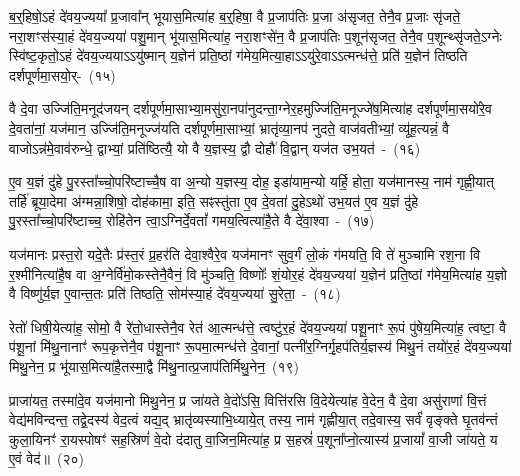 {\anuvakamend[{अ॒न्वा॒हा॒र्ये॑ण प्र॒जा\-प॑तेरसि॒ ह्य॑मुष्मिँ॑ल्लो॒के पञ्च॑दश च}]}

ब॒र्॒\mbox{}हिषो॒\-ऽहं दे॑वय॒ज्यया᳚ प्र॒जावा᳚न् भूयास॒मित्या॑ह ब॒र्॒\mbox{}हिषा॒ वै प्र॒जा\-प॑तिः प्र॒जा अ॑सृजत॒ तेनै॒व प्र॒जाः सृ॑जते॒ नरा॒शꣳस॑स्या॒हं दे॑वय॒ज्यया॑ पशु॒मान् भू॑यास॒मित्या॑ह॒ नरा॒शꣳसे॑न॒ वै प्र॒जा\-प॑तिः प॒शून॑सृजत॒ तेनै॒व प॒शून्थ्सृ॑जते॒\-ऽग्नेः स्वि॑ष्ट॒कृतो॒\-ऽहं दे॑वय॒ज्यया\-ऽऽ\-यु॑ष्मान् य॒ज्ञेन॑ प्रति॒ष्ठां ग॑मेय॒मित्या॒हा\-ऽऽ\-यु॑रे॒वा\-ऽऽ\-त्मन्ध॑त्ते॒ प्रति॑ य॒ज्ञेन॑ तिष्ठति दर्\mbox{}श\-पूर्ण\-मा॒सयो॒र्-~(१५)\ip

वै दे॒वा उज्जि॑ति॒मनूद॑जयन् दर्\mbox{}श\-पूर्ण\-मा॒साभ्या॒मसु॑रा॒नपा॑\-नुदन्ता॒ग्नेर॒ह\-मुज्जि॑ति॒\-मनूज्जे॑ष॒मित्या॑ह दर्\mbox{}श\-पूर्ण\-मा॒सयो॑रे॒व दे॒वता॑नां॒ यज॑मान॒ उज्जि॑ति॒मनूज्ज॑यति दर्\mbox{}श\-पूर्ण\-मा॒साभ्यां॒ भ्रातृ॑व्या॒नप॑ नुदते॒ वाज॑वतीभ्यां॒ व्यू॑ह॒त्यन्नं॒ वै वाजो\-ऽन्न॑मे॒वाव॑\-रुन्धे॒ द्वाभ्यां॒ प्रति॑ष्ठित्यै॒ यो वै य॒ज्ञस्य॒ द्वौ दोहौ॑ वि॒द्वान् यज॑त उभ॒यत॑~-~(१६)\ip

ए॒व य॒ज्ञं दु॑हे पु॒रस्ता᳚च्चो॒परि॑ष्टाच्चै॒ष वा अ॒न्यो य॒ज्ञस्य॒ दोह॒ इडा॑याम॒न्यो यर्\mbox{}हि॒ होता॒ यज॑मानस्य॒ नाम॑ गृह्णी॒यात् तर्\mbox{}हि॑ ब्रूया॒देमा अ॑ग्मन्ना॒शिषो॒ दोह॑कामा॒ इति॒ सꣴस्तु॑ता ए॒व दे॒वता॑ दु॒हे\-ऽथो॑ उभ॒यत॑ ए॒व य॒ज्ञं दु॑हे पु॒रस्ता᳚च्चो॒परि॑ष्टाच्च॒ रोहि॑तेन त्वा॒\-ऽग्निर्दे॒वतां᳚ गमय॒त्वित्या॑है॒ते वै दे॑वा॒श्वा~-~(१७)\ip

यज॑मानः प्रस्त॒रो यदे॒तैः प्र॑स्त॒रं प्र॒हर॑ति देवा॒श्वैरे॒व यज॑मानꣳ सुव॒र्गं लो॒कं ग॑मयति॒ वि ते॑ मुञ्चामि रश॒ना वि र॒श्मीनित्या॑है॒ष वा अ॒ग्नेर्वि॑मो॒कस्तेनै॒वैनं॒ वि मु॑ञ्चति॒ विष्णोः᳚ शं॒योर॒हं दे॑वय॒ज्यया॑ य॒ज्ञेन॑ प्रति॒ष्ठां ग॑मेय॒मित्या॑ह य॒ज्ञो वै विष्णु॑र्य॒ज्ञ ए॒वान्त॒तः प्रति॑ तिष्ठति॒ सोम॑स्या॒हं दे॑वय॒ज्यया॑ सु॒रेता॒~-~(१८)\ip

रेतो॑ धिषी॒येत्या॑ह॒ सोमो॒ वै रे॑तो॒धास्तेनै॒व रेत॑ आ॒त्मन्ध॑त्ते॒ त्वष्टु॑र॒हं दे॑वय॒ज्यया॑ पशू॒नाꣳ रू॒पं पु॑षेय॒मित्या॑ह॒ त्वष्टा॒ वै प॑शू॒नां मि॑थु॒नानाꣳ॑ रूप॒कृत्तेनै॒व प॑शू॒नाꣳ रू॒पमा॒त्मन्ध॑त्ते दे॒वानां॒ पत्नी॑र॒ग्निर्गृ॒हप॑तिर्य॒ज्ञस्य॑ मिथु॒नं तयो॑र॒हं दे॑वय॒ज्यया॑ मिथु॒नेन॒ प्र भू॑यास॒मित्या॑है॒तस्मा॒द्वै मि॑थु॒नात्प्र॒जा\-प॑तिर्मिथु॒नेन॒~(१९)\ip

प्राजा॑यत॒ तस्मा॑दे॒व यज॑मानो मिथु॒नेन॒ प्र जा॑यते वे॒दो॑\-ऽसि॒ वित्ति॑रसि वि॒देयेत्या॑ह वे॒देन॒ वै दे॒वा असु॑राणां वि॒त्तं वेद्य॑मविन्दन्त॒ तद्वे॒दस्य॑ वेद॒त्वं यद्य॒द् भ्रातृ॑व्यस्याभि॒ध्याये॒त् तस्य॒ नाम॑ गृह्णीया॒त् तदे॒वास्य॒ सर्वं॑ वृङ्क्ते घृ॒तव॑न्तं कुला॒यिनꣳ॑ रा॒यस्पोषꣳ॑ सह॒स्रिणं॑ वे॒दो द॑दातु वा॒जिन॒मित्या॑ह॒ प्र स॒हस्रं॑ प॒शूना᳚प्नो॒त्यास्य॑ प्र॒जायां᳚ वा॒जी जा॑यते॒ य ए॒वं वेद॑॥~(२०)\ip

